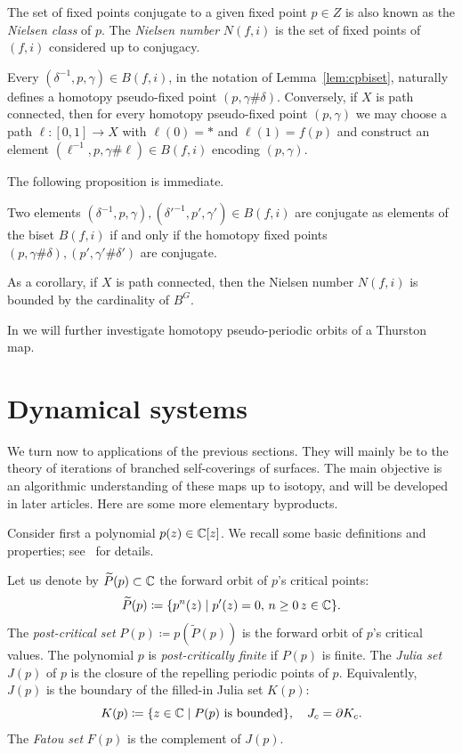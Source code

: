 \documentclass{amsart}
\begin{document}
The set of fixed points conjugate to a given fixed point $p\in Z$ is also
known as the \emph{Nielsen class} of $p$. The \emph{Nielsen number}
$N(f,i)$ is the set of fixed points of $(f,i)$ considered up to conjugacy.

Every $(\delta^{-1}, p, \gamma )\in B(f,i)$, in the notation of
Lemma~\ref{lem:cpbiset}, naturally defines a homotopy pseudo-fixed point
$(p,\gamma\#\delta)$. Conversely, if $X$ is path connected, then for every
homotopy pseudo-fixed point $(p,\gamma)$ we may choose a path $\ell\colon
[0,1]\to X$ with $\ell(0)=*$ and $\ell(1)=f(p)$ and construct an element
$(\ell^{-1},p,\gamma\#\ell)\in B(f,i)$ encoding $(p,\gamma)$.

\noindent The following proposition is immediate. 
\begin{prop}
  Two elements $(\delta^{-1}, p, \gamma), (\delta'^{-1}, p', \gamma')\in
  B(f,i)$ are conjugate as elements of the biset $B(f,i)$ if and only if
  the homotopy fixed points $(p,\gamma\#\delta),(p',\gamma'\#\delta')$ are
  conjugate.
\end{prop}

As a corollary, if $X$ is path connected, then the Nielsen number $N(f,i)$
is bounded by the cardinality of $B^{G}$.

In \cite{bartholdi-dudko:bc4} we will further investigate homotopy
pseudo-periodic orbits of a Thurston map.

\section{Dynamical systems}\label{ss:dynamics}
We turn now to applications of the previous sections. They will mainly
be to the theory of iterations of branched self-coverings of
surfaces. The main objective is an algorithmic understanding of these
maps up to isotopy, and will be developed in later articles. Here are
some more elementary byproducts.

Consider first a polynomial $p(z)\in{\mathbb C}[z]$. We recall some basic
definitions and properties; see~\cites{douady-h:edpc1,douady-h:edpc2}
for details.

\noindent Let us denote by $\widetilde P(p)\subset {\mathbb C}$ the forward orbit of
$p$'s critical points:
\[\widetilde P(p)\coloneqq\{p^n(z)\mid p'(z)=0,\,n\ge0\, z\in {\mathbb C}\}.\]
The \emph{post-critical set} $P(p)\coloneqq p(\widetilde P(p))$ is the
forward orbit of $p$'s critical values. The polynomial $p$ is
\emph{post-critically finite} if $P(p)$ is finite. The \emph{Julia set}
$J(p)$ of $p$ is the closure of the repelling periodic points of
$p$. Equivalently, $J(p)$ is the boundary of the filled-in Julia set
$K(p)$:
\[K(p)\coloneqq\{z\in {\mathbb C}\mid P(p)\text{ is bounded}\},\quad J_c=\partial K_c.
\]
The \emph{Fatou set} $F(p)$ is the complement of $J(p)$.
\end{document}
